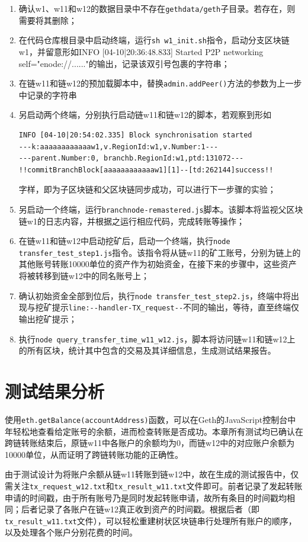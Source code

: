 \begin{enumerate}
    \item 确认w1、w11和w12的数据目录中不存在\verb|gethdata/geth|子目录。若存在，则需要将其删除；
    \item 在代码仓库根目录中启动终端，运行\verb|sh w1_init.sh|指令，启动分支区块链w1，并留意形如INFO [04-10|20:36:48.833] Started P2P networking self="enode://......"的输出，记录该双引号包裹的字符串；
    \item 在链w11和链w12的预加载脚本中，替换\verb|admin.addPeer()|方法的参数为上一步中记录的字符串
    \item 另启动两个终端，分别执行启动链w11和链w12的脚本，若观察到形如\begin{verbatim}
INFO [04-10|20:54:02.335] Block synchronisation started
---k:aaaaaaaaaaaaw1,v.RegionId:w1,v.Number:1---
---parent.Number:0, branchb.RegionId:w1,ptd:131072---
!!commitBranchBlock[aaaaaaaaaaaaw1][1]--[td:262144]success!!
    \end{verbatim}
          字样，即为子区块链和父区块链同步成功，可以进行下一步骤的实验；
    \item 另启动一个终端，运行\verb|branchnode-remastered.js|脚本。该脚本将监视父区块链w1的日志内容，并根据之运行相应代码，完成转账等操作；
    \item 在链w11和链w12中启动挖矿后，启动一个终端，执行\verb|node transfer_test_step1.js|指令。该指令将从链w11的矿工账号，分别为链上的其他账号转账10000单位的资产作为初始资金，在接下来的步骤中，这些资产将被转移到链w12中的同名账号上；
    \item 确认初始资金全部到位后，执行\verb|node transfer_test_step2.js|，终端中将出现与挖矿提示\verb|line:--handler-TX_request--|不同的输出，等待，直至终端仅输出挖矿提示；
    \item 执行\verb|node query_transfer_time_w11_w12.js|，脚本将访问链w11和链w12上的所有区块，统计其中包含的交易及其详细信息，生成测试结果报告。
\end{enumerate}

\section{测试结果分析}

使用\verb|eth.getBalance(accountAddress)|函数，可以在Geth的JavaScript控制台中年轻松地查看给定账号的余额，进而检查转账是否成功。本章所有测试均已确认在跨链转账结束后，原链w11中各账户的余额均为0，而链w12中的对应账户余额为10000单位，从而证明了跨链转账功能的正确性。

由于测试设计为将账户余额从链w11转账到链w12中，故在生成的测试报告中，仅需关注\verb|tx_request_w12.txt|和\verb|tx_result_w11.txt|文件即可。前者记录了发起转账申请的时间戳，由于所有账号乃是同时发起转账申请，故所有条目的时间戳均相同；后者记录了各账户在链w12真正收到资产的时间戳。根据后者（即\verb|tx_result_w11.txt|文件），可以轻松重建树状区块链串行处理所有账户的顺序，以及处理各个账户分别花费的时间。

